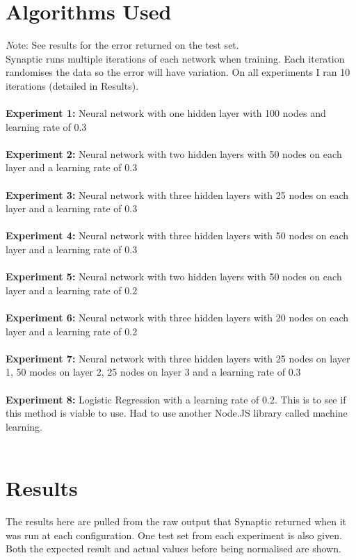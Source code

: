 \documentclass[11pt]{article}
\begin{document}
\begin{page}
\section{Algorithms Used}
\emph Note: See results for the error returned on the test set.\\
 
\noindent Synaptic runs multiple iterations of each network when training. Each iteration randomises the data so the error will have variation. On all experiments I ran 10 iterations (detailed in Results).\\
\\
\noindent \textbf{Experiment 1:} Neural network with one hidden layer with 100 nodes and learning rate of 0.3\\\\
\textbf{Experiment 2:} Neural network with two hidden layers with 50 nodes on each layer and a learning rate of 0.3\\\\
\textbf{Experiment 3:} Neural network with three hidden layers with 25 nodes on each layer and a learning rate of 0.3\\\\
\textbf{Experiment 4:} Neural network with three hidden layers with 50 nodes on each layer and a learning rate of 0.3\\\\
\textbf{Experiment 5:} Neural network with two hidden layers with 50 nodes on each layer and a learning rate of 0.2\\\\
\textbf{Experiment 6:} Neural network with three hidden layers with 20 nodes on each layer and a learning rate of 0.2\\\\
\textbf{Experiment 7:} Neural network with three hidden layers with 25 nodes on layer 1, 50 modes on layer 2, 25 nodes on layer 3 and a learning rate of 0.3\\\\
\textbf{Experiment 8:} Logistic Regression with a learning rate of 0.2. This is to see if this method is viable to use. Had to use another Node.JS library called machine learning.\\\\

\section{Results}
The results here are pulled from the raw output that Synaptic returned when it was run at each configuration. One test set from each experiment is also given. Both the expected result and actual values before being normalised are shown.\\


\end{page}
\end{document}
